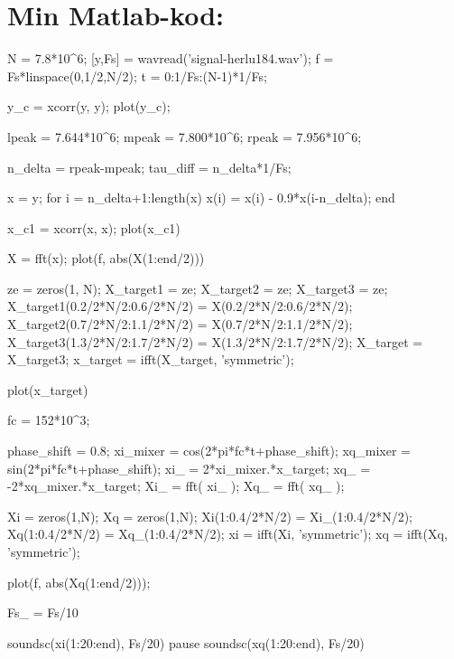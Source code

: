 \documentclass[10pt,twocolumn,a4paper]{article}
\begin{document}
\section*{Min Matlab-kod:}
\begin{spverbatim}
N = 7.8*10^6;
[y,Fs] = wavread('signal-herlu184.wav');
f = Fs*linspace(0,1/2,N/2);
t = 0:1/Fs:(N-1)*1/Fs;

% 
y_c = xcorr(y, y);
plot(y_c);

lpeak = 7.644*10^6;
mpeak = 7.800*10^6;
rpeak = 7.956*10^6;

n_delta = rpeak-mpeak;
tau_diff = n_delta*1/Fs;

%
x = y;
for i = n_delta+1:length(x)
    x(i) = x(i) - 0.9*x(i-n_delta);
end

x_c1 = xcorr(x, x);
plot(x_c1)

X = fft(x);
plot(f, abs(X(1:end/2)))

ze = zeros(1, N);
X_target1 = ze;
X_target2 = ze;
X_target3 = ze;
X_target1(0.2/2*N/2:0.6/2*N/2) = X(0.2/2*N/2:0.6/2*N/2);
X_target2(0.7/2*N/2:1.1/2*N/2) = X(0.7/2*N/2:1.1/2*N/2);
X_target3(1.3/2*N/2:1.7/2*N/2) = X(1.3/2*N/2:1.7/2*N/2);
X_target = X_target3;
x_target = ifft(X_target, 'symmetric');

plot(x_target)

fc = 152*10^3;

%
%
phase_shift = 0.8;
xi_mixer = cos(2*pi*fc*t+phase_shift);
xq_mixer = sin(2*pi*fc*t+phase_shift);
xi_ = 2*xi_mixer.*x_target;
xq_ = -2*xq_mixer.*x_target;
Xi_ = fft( xi_ );
Xq_ = fft( xq_ );

Xi = zeros(1,N);
Xq = zeros(1,N);
Xi(1:0.4/2*N/2) = Xi_(1:0.4/2*N/2);
Xq(1:0.4/2*N/2) = Xq_(1:0.4/2*N/2);
xi = ifft(Xi, 'symmetric');
xq = ifft(Xq, 'symmetric');

plot(f, abs(Xq(1:end/2)));

Fs_ = Fs/10

soundsc(xi(1:20:end), Fs/20)
pause
soundsc(xq(1:20:end), Fs/20)  

\end{spverbatim}
\end{document}
